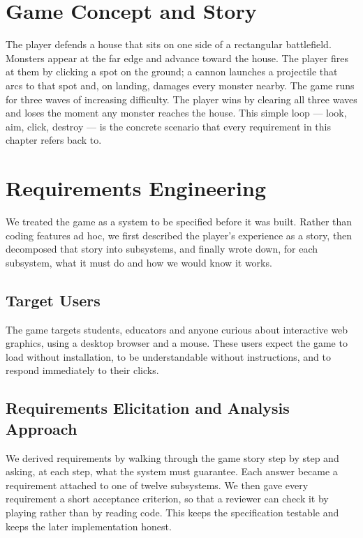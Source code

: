 \documentclass[12pt,a4paper]{report}
\begin{document}
\section{Game Concept and Story}

The player defends a house that sits on one side of a rectangular battlefield.
Monsters appear at the far edge and advance toward the house. The player fires
at them by clicking a spot on the ground; a cannon launches a projectile that
arcs to that spot and, on landing, damages every monster nearby. The game runs
for three waves of increasing difficulty. The player wins by clearing all three
waves and loses the moment any monster reaches the house. This simple loop ---
look, aim, click, destroy --- is the concrete scenario that every requirement in
this chapter refers back to.

\section{Requirements Engineering}

We treated the game as a system to be specified before it was built. Rather than
coding features ad hoc, we first described the player's experience as a story,
then decomposed that story into subsystems, and finally wrote down, for each
subsystem, what it must do and how we would know it works.

\subsection{Target Users}

The game targets students, educators and anyone curious about interactive web
graphics, using a desktop browser and a mouse. These users expect the game to
load without installation, to be understandable without instructions, and to
respond immediately to their clicks. 

\subsection{Requirements Elicitation and Analysis Approach}

We derived requirements by walking through the game story step by step and
asking, at each step, what the system must guarantee. Each answer became a
requirement attached to one of twelve subsystems. We then gave every requirement
a short acceptance criterion, so that a reviewer can check it by playing rather
than by reading code. This keeps the specification testable and keeps the later
implementation honest.
\end{document}
